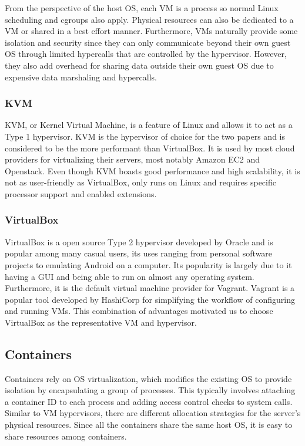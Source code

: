 \documentclass{sig-alternate-10pt}
\begin{document}
From the perspective of the host OS, each VM is a process so normal Linux scheduling and cgroups also apply. Physical resources can also be dedicated to a VM or shared in a best effort manner. Furthermore, VMs naturally provide some isolation and security since they can only communicate beyond their own guest OS through limited hypercalls that are controlled by the hypervisor. However, they also add overhead for sharing data outside their own guest OS due to expensive data marshaling and hypercalls\cite{felter:2014}. 

\subsubsection{KVM}
KVM, or Kernel Virtual Machine, is a feature of Linux and allows it to act as a Type 1 hypervisor\cite{felter:2014}. KVM is the hypervisor of choice for the two papers and is considered to be the more performant than VirtualBox. It is used by most cloud providers for virtualizing their servers, most notably Amazon EC2 and Openstack. Even though KVM boasts good performance and high scalability, it is not as user-friendly as VirtualBox, only runs on Linux and requires specific processor support and enabled extensions.

\subsubsection{VirtualBox}
VirtualBox is a open source Type 2 hypervisor developed by Oracle and is popular among many casual users, its uses ranging from personal software projects to emulating Android on a computer. Its popularity is largely due to it having a GUI and being able to run on almost any operating system. Furthermore, it is the default virtual machine provider for Vagrant\cite{vagrant}. Vagrant is a popular tool developed by HashiCorp for simplifying the workflow of configuring and running VMs. This combination of advantages motivated us to choose VirtualBox as the representative VM and hypervisor.

\subsection{Containers}
Containers rely on OS virtualization, which modifies the existing OS to provide isolation by encapsulating a group of processes. This typically involves attaching a container ID to each process and adding access control checks to system calls. Similar to VM hypervisors, there are different allocation strategies for the server's physical resources. Since all the containers share the same host OS, it is easy to share resources among containers.
\end{document}
